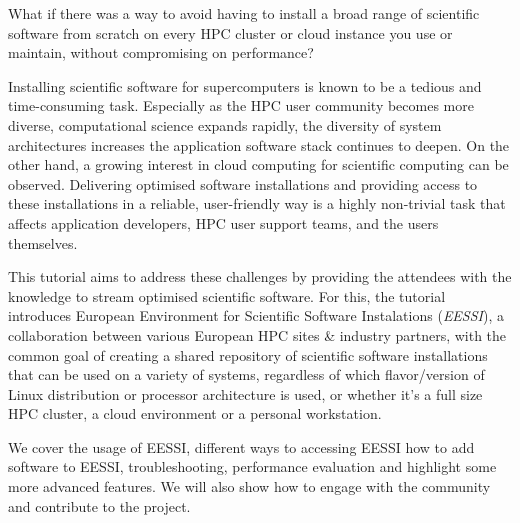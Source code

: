 
What if there was a way to avoid having to install a broad range of scientific software from scratch on every HPC cluster or cloud instance you use or maintain, without compromising on performance?

Installing scientific software for supercomputers is known to be a tedious and time-consuming task. Especially as the HPC user community becomes more diverse, computational science expands rapidly, the diversity of system architectures increases the application software stack continues to deepen. On the other hand, a growing interest in cloud computing for scientific computing can be observed. Delivering optimised software installations and providing access to these installations in a reliable, user-friendly way is a highly non-trivial task that affects application developers, HPC user support teams, and the users themselves.

This tutorial aims to address these challenges by providing the attendees with the knowledge to stream optimised scientific software. For this, the tutorial introduces European Environment for Scientific Software Instalations (\emph{EESSI}), a collaboration between various European HPC sites \& industry partners, with the common goal of creating a shared repository of scientific software installations that can be used on a variety of systems, regardless of which flavor/version of Linux distribution or processor architecture is used, or whether it’s a full size HPC cluster, a cloud environment or a personal workstation.

We cover the usage of EESSI, different ways to accessing EESSI how to add software to EESSI, troubleshooting, performance evaluation and highlight some more advanced features. We will also show how to engage with the community and contribute to the project.

